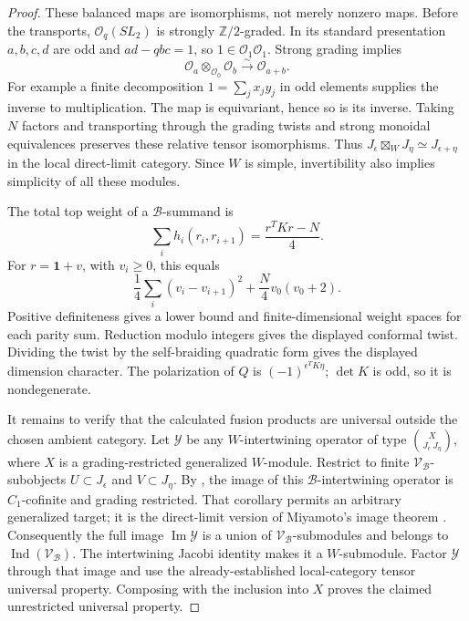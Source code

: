\documentclass[11pt,a4paper]{article}
\numberwithin{equation}{section}
\theoremstyle{definition}\newtheorem{definition}[theorem]{Definition}
\theoremstyle{remark}\newtheorem{remark}[theorem]{Remark}
\newcommand{\Ind}{\operatorname{Ind}}\newcommand{\Irr}{\operatorname{Irr}}
\newcommand{\bo}{\boxtimes}\newcommand{\Cat}{\mathcal C}
\begin{document}
\begin{proof}
These balanced maps are isomorphisms, not merely nonzero maps. Before the
transports, $\mathcal O_q(SL_2)$ is strongly $\mathbb Z/2$-graded. In its
standard presentation $a,b,c,d$ are odd and $ad-qbc=1$, so
$1\in\mathcal O_1\mathcal O_1$. Strong grading implies
\[
 \mathcal O_a\otimes_{\mathcal O_0}\mathcal O_b
          \xrightarrow{\sim}\mathcal O_{a+b}.
\]
For example a finite decomposition $1=\sum_jx_jy_j$ in odd elements
supplies the inverse to multiplication. The map is equivariant, hence so
is its inverse. Taking $N$ factors and transporting through the grading
twists and strong monoidal equivalences preserves these relative tensor
isomorphisms. Thus $J_\epsilon\bo_WJ_\eta\simeq J_{\epsilon+\eta}$ in
the local direct-limit category. Since $W$ is simple, invertibility also
implies simplicity of all these modules.

The total top weight of a $\mathcal B$-summand is
\[
 \sum_i h_i(r_i,r_{i+1})=\frac{r^TKr-N}{4}.
\]
For $r=\mathbf1+v$, with $v_i\geq0$, this equals
\[
 \frac14\sum_i(v_i-v_{i+1})^2+\frac N4v_0(v_0+2).
\]
Positive definiteness gives a lower bound and finite-dimensional weight
spaces for each parity sum. Reduction modulo integers gives the displayed
conformal twist. Dividing the twist by the self-braiding quadratic form
gives the displayed dimension character. The polarization of $Q$ is
$(-1)^{\epsilon^TK\eta}$; $\det K$ is odd, so it is nondegenerate.

It remains to verify that the calculated fusion products are universal
outside the chosen ambient category. Let $\mathcal Y$ be any $W$-intertwining
operator of type $\binom X{J_\epsilon\ J_\eta}$, where $X$ is a
grading-restricted generalized $W$-module. Restrict to finite
$\mathscr V_{\mathcal B}$-subobjects $U\subset J_\epsilon$ and $V\subset J_\eta$.
By \cite[Corollary 2.14]{cmy}, the image of this $\mathcal B$-intertwining operator
is $C_1$-cofinite and grading restricted. That corollary permits an
arbitrary generalized target; it is the direct-limit version of
Miyamoto's image theorem \cite{c:Miyamoto}. Consequently the full image
$\operatorname{Im}\mathcal Y$ is a union of $\mathscr V_{\mathcal B}$-submodules and
belongs to $\Ind(\mathscr V_{\mathcal B})$. The intertwining Jacobi identity makes it
a $W$-submodule. Factor $\mathcal Y$ through that image and use the
already-established local-category tensor universal property. Composing
with the inclusion into $X$ proves the claimed unrestricted universal
property.
\end{proof}
\end{document}
